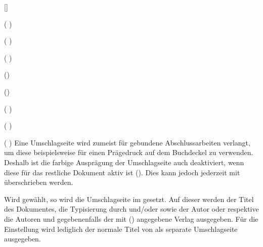 \begin{Declaration*}{}
\begin{Declaration*}{}
\begin{Declaration*}{}
\begin{Declaration}{[]}
\begin{Declaration}[v2.02]{%
}
\begin{Declaration}{}
\begin{Declaration}[v2.02]{}(%
)
\begin{Declaration}[v2.03]{}(%
)
\begin{Declaration}[v2.03]{}(%
)
\begin{Declaration}[v2.03]{%
}()
\begin{Declaration}[v2.03]{%
}()
\begin{Declaration}[v2.03]{}(%
)
\begin{Declaration}[v2.03]{}(%
)
\begin{Declaration}[v2.03]{}(%
)
\printdeclarationlist%
%
%
Eine Umschlagseite wird zumeist für gebundene Abschlussarbeiten verlangt, um 
diese beispielsweise für einen Prägedruck auf dem Buchdeckel zu verwenden. 
Deshalb ist die farbige Ausprägung der Umschlagseite auch deaktiviert, wenn 
diese für das restliche Dokument aktiv ist (). Dies kann 
jedoch jederzeit mit  überschrieben werden.

Wird  gewählt, so wird die Umschlagseite im \TUDCD 
gesetzt. Auf dieser werden der Titel des Dokumentes, die Typisierung 
durch  und/oder  sowie der Autor oder respektive 
die Autoren und gegebenenfalls der mit ()
angegebene Verlag ausgegeben.
Für die Einstellung  wird lediglich der normale 
Titel von \KOMAScript{} als separate Umschlagseite ausgegeben. 


\end{Declaration}
\end{Declaration}
\end{Declaration}
\end{Declaration}
\end{Declaration}
\end{Declaration}
\end{Declaration}
\end{Declaration}
\end{Declaration}
\end{Declaration}
\end{Declaration}
\end{Declaration*}
\end{Declaration*}
\end{Declaration*}

